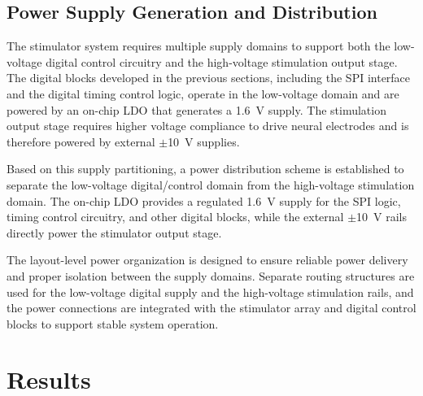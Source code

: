 \documentclass[lettersize,journal]{IEEEtran}
\begin{document}
\subsection{Power Supply Generation and Distribution}

The stimulator system requires multiple supply domains to support both the low-voltage digital control circuitry and the high-voltage stimulation output stage. The digital blocks developed in the previous sections, including the SPI interface and the digital timing control logic, operate in the low-voltage domain and are powered by an on-chip LDO that generates a 1.6~V supply. The stimulation output stage requires higher voltage compliance to drive neural electrodes and is therefore powered by external $\pm$10~V supplies.

Based on this supply partitioning, a power distribution scheme is established to separate the low-voltage digital/control domain from the high-voltage stimulation domain. The on-chip LDO provides a regulated 1.6~V supply for the SPI logic, timing control circuitry, and other digital blocks, while the external $\pm$10~V rails directly power the stimulator output stage.

The layout-level power organization is designed to ensure reliable power delivery and proper isolation between the supply domains. Separate routing structures are used for the low-voltage digital supply and the high-voltage stimulation rails, and the power connections are integrated with the stimulator array and digital control blocks to support stable system operation.

\section{Results}
\end{document}
